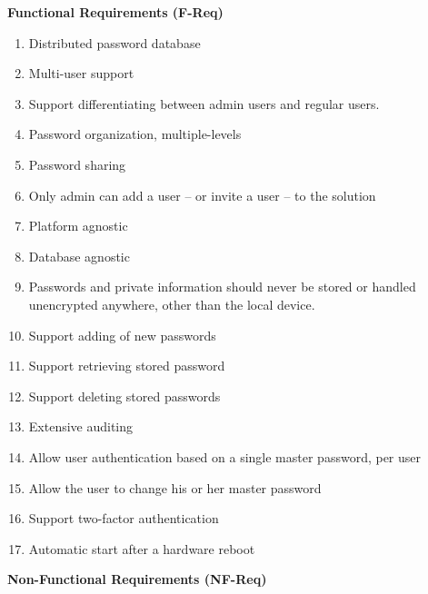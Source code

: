 				\textbf{Functional Requirements (F-Req)}
					\vspace{-3ex}\begin{enumerate}
						 \setlength\itemsep{0.1em}
						\item Distributed password database \label{item:distrib_password}
						\item Multi-user support \label{item:multi_user}
						\item Support differentiating between admin users and regular users. \label{item:admin_user}
						\item Password organization, multiple-levels \label{item:organization}
						\item Password sharing \label{item:sharing}
						\item Only admin can add a user -- or invite a user -- to the solution \label{item:add}
						\item Platform agnostic \label{item:platform}
						\item Database agnostic \label{item:database}
						\item Passwords and private information should never be stored or handled unencrypted anywhere, other than the local device. \label{item:passwords_local}
						\item Support adding of new passwords \label{item:new}
						\item Support retrieving stored password \label{item:retrieve}
						\item Support deleting stored passwords \label{item:delete}
						\item Extensive auditing \label{item:audit}
						\item Allow user authentication based on a single master password, per user \label{item:auth}
						\item Allow the user to change his or her master password \label{item:change}
						\item Support two-factor authentication \label{item:two-factor}
						\item Automatic start after a hardware reboot \label{item:restart}
					\end{enumerate}
				\textbf{Non-Functional Requirements (NF-Req)}
